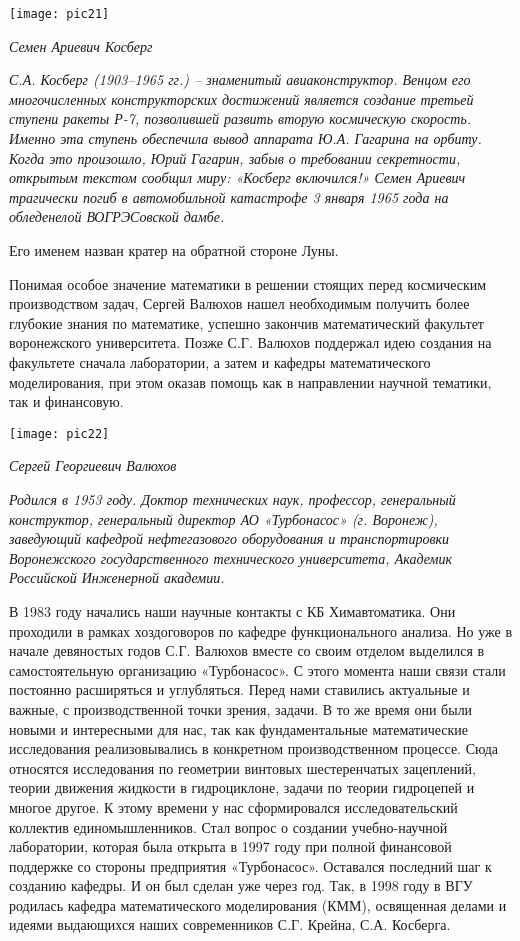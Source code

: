 \begin{center}

\texttt{[image: pic21]}


{\it Семен Ариевич Косберг}
\end{center}

{\it С.А. Косберг (1903–1965 гг.) – знаменитый авиаконструктор. Венцом его многочисленных конструкторских достижений является создание третьей ступени ракеты Р-7, позволившей развить вторую космическую скорость. Именно эта ступень обеспечила вывод аппарата Ю.А. Гагарина на орбиту. Когда это произошло, Юрий Гагарин, забыв о требовании секретности, открытым текстом сообщил миру: «Косберг включился!» Семен Ариевич трагически погиб в автомобильной катастрофе 3 января 1965 года на обледенелой ВОГРЭСовской дамбе.

Его именем назван кратер на обратной стороне Луны.
}

Понимая особое значение математики в решении стоящих перед космическим производством задач, Сергей Валюхов нашел необходимым получить более глубокие знания по математике, успешно закончив математический факультет воронежского университета.
 Позже С.Г. Валюхов поддержал идею создания на факультете сначала лаборатории, а затем и кафедры математического моделирования, при этом оказав помощь как в направлении научной тематики, так и финансовую.


\begin{center}

\texttt{[image: pic22]}


{\it Сергей Георгиевич Валюхов}
\end{center}

{\it Родился в 1953 году. Доктор технических наук, профессор, генеральный конструктор, генеральный директор АО «Турбонасос» (г. Воронеж), заведующий кафедрой нефтегазового оборудования и транспортировки Воронежского государственного технического университета, Академик Российской Инженерной академии.}

В 1983 году начались наши научные контакты с КБ Химавтоматика. Они проходили в рамках хоздоговоров по кафедре функционального анализа. Но уже в начале девяностых годов С.Г. Валюхов вместе со своим отделом выделился в самостоятельную организацию «Турбонасос».  С этого момента наши связи стали постоянно расширяться и углубляться. Перед нами ставились актуальные и важные, с производственной точки зрения, задачи. В то же время они были новыми и интересными для нас, так как фундаментальные математические исследования реализовывались в конкретном производственном процессе. Сюда относятся исследования по геометрии винтовых шестеренчатых зацеплений, теории движения жидкости в гидроциклоне, задачи по теории гидроцепей и многое другое.
К этому времени у нас сформировался исследовательский коллектив единомышленников. Стал вопрос о создании учебно-научной лаборатории, которая была открыта в 1997 году при полной финансовой поддержке со стороны предприятия «Турбонасос». Оставался последний шаг к созданию кафедры. И он был сделан уже через год. Так, в 1998 году в ВГУ родилась кафедра математического моделирования (КММ), освященная делами и идеями выдающихся наших современников С.Г. Крейна, С.А. Косберга.

